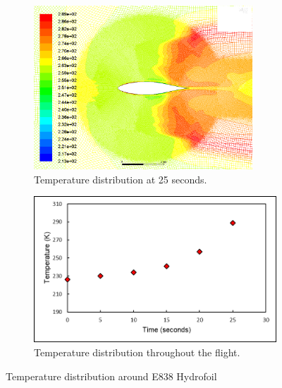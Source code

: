 \begin{figure}[H]
\centering
\begin{subfigure}[b]{.5\textwidth}
  \centering
  \includegraphics[width=0.9\textwidth]{Aeroshell/temp_contour.png}
  \caption{\label{fig:tempcontour}Temperature distribution at 25 seconds.}
\end{subfigure}%
\begin{subfigure}[b]{.5\textwidth}
	\centering
    \includegraphics[width=0.9\linewidth]{Aeroshell/tempdistribution.png}
    \caption{\label{fig:tempdistribution}Temperature distribution throughout the flight.}
\end{subfigure}
\caption{\label{fig:totaltemp}Temperature distribution around E838 Hydrofoil}
\end{figure}

